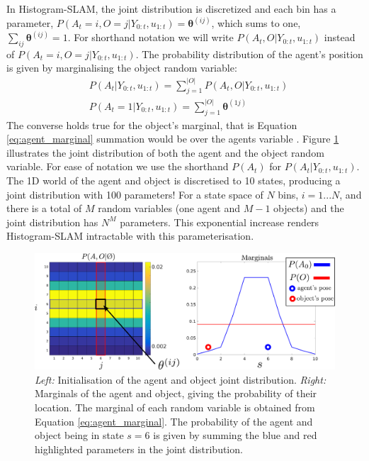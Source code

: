 In Histogram-SLAM, the joint distribution is discretized and each bin has a parameter, 
$P(A_t=i,O=j|Y_{0:t},u_{1:t}) = \boldsymbol{\theta}^{(ij)}$, which sums to one, $\sum_{ij} \boldsymbol{\theta}^{(ij)} = 1$. 
For shorthand notation we will write $P(A_t,O|Y_{0:t},u_{1:t})$ instead of $P(A_t=i,O=j|Y_{0:t},u_{1:t})$.
The probability distribution of the agent's position is given by marginalising the object random variable:
\begin{align}
 &P(A_t|Y_{0:t},u_{1:t})    = \sum\limits_{j=1}^{|O|} P(A_t,O|Y_{0:t},u_{1:t}) \label{eq:agent_marginal} \\
 &P(A_t=1|Y_{0:t},u_{1:t})  = \sum\limits_{j=1}^{|O|} \boldsymbol{\theta}^{(1j)}
\end{align}
The converse holds true for the object's marginal, that is Equation \ref{eq:agent_marginal} summation would be over 
the agents variable . Figure \ref{fig:histogram_joint} illustrates the joint distribution of both the agent and the object random variable. 
For ease of notation we use the shorthand $P(A_t)$ for $P(A_t|Y_{0:t},u_{1:t})$. The 1D world of the agent and object is discretised to 10 states, producing 
a joint distribution with 100 parameters!
For a state space of $N$ bins, $i=1...N$, and there is a total of $M$ random variables (one agent and $M-1$ objects)
and the joint distribution has $N^{M}$ parameters. This exponential increase renders Histogram-SLAM intractable
with this parameterisation.

\begin{figure}
 \centering
 \includegraphics[width=\textwidth]{./ch5-MLMF/Figures/explenation/hist_SLAM.pdf}
 \caption{\textit{Left:} Initialisation of the agent and object joint distribution. 
 \textit{Right:} Marginals of the agent and object, giving the probability of their location. The marginal of each 
 random variable is obtained from Equation \ref{eq:agent_marginal}. The probability of
 the agent and object being in state $s=6$ is given by summing the blue and red highlighted parameters in the joint distribution. }
 \label{fig:histogram_joint}
\end{figure}

